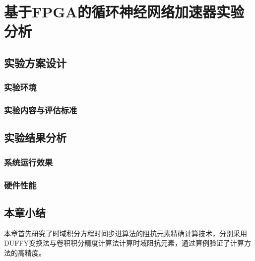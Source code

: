 \chapter{基于FPGA的循环神经网络加速器实验分析}
\section{实验方案设计}

\subsection{实验环境}
\subsection{实验内容与评估标准}

\section{实验结果分析}

\subsection{系统运行效果}

\subsection{硬件性能}

\section{本章小结}
本章首先研究了时域积分方程时间步进算法的阻抗元素精确计算技术，分别采用DUFFY变换法与卷积积分精度计算法计算时域阻抗元素，通过算例验证了计算方法的高精度。
